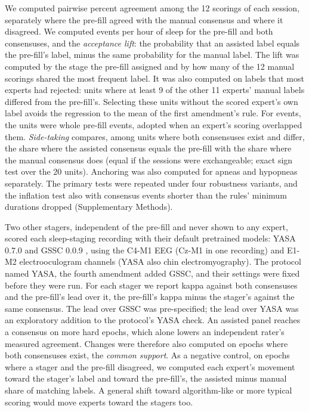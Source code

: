 \documentclass[11pt]{article}
\begin{document}
We computed pairwise percent agreement among the 12 scorings of each session, separately where the pre-fill agreed
with the manual consensus and where it disagreed. We computed events per hour of sleep for the pre-fill and both consensuses, and the \emph{acceptance lift}: the
probability that an assisted label equals the pre-fill's label, minus the same probability for the manual label. The lift was computed by the stage the pre-fill
assigned and by how many of the 12 manual scorings shared the most frequent label. It was also computed on labels
that most experts had rejected: units where at least 9 of the other 11 experts' manual labels differed from the
pre-fill's. Selecting these units without the scored expert's own label avoids the regression to the mean of the
first amendment's rule. For events, the units were whole pre-fill events, adopted when an expert's scoring overlapped
them. \emph{Side-taking} compares, among units where both consensuses exist and differ, the share where the assisted
consensus equals the pre-fill with the share where the manual consensus does (equal if the sessions were
exchangeable; exact sign test over the 20 units). Anchoring was also computed for apneas and
hypopneas separately. The primary tests were repeated under four robustness variants, and the inflation test also
with consensus events shorter than the rules' minimum durations dropped (Supplementary Methods).

Two other stagers, independent of the pre-fill and never shown to any expert, scored each sleep-staging recording with
their default pretrained models: YASA 0.7.0 \citep{vallat2021} and GSSC 0.0.9 \citep{hanna2023}, using the C4-M1 EEG
(Cz-M1 in one recording) and E1-M2 electrooculogram channels (YASA also chin electromyography). The protocol named YASA, the fourth amendment added GSSC, and their settings were fixed before they were run. For
each stager we report kappa against both consensuses and the pre-fill's lead over it, the pre-fill's kappa minus the
stager's against the same consensus. The lead over GSSC was pre-specified; the lead over YASA was an exploratory
addition to the protocol's YASA check. An assisted panel reaches a consensus on more hard epochs, which alone lowers
an independent rater's measured agreement. Changes were therefore also computed on epochs where both consensuses
exist, the \emph{common support}. As a negative control, on epochs where a stager and the pre-fill disagreed, we
computed each expert's movement toward the stager's label and toward the pre-fill's, the assisted minus manual share
of matching labels. A general shift toward algorithm-like or more typical scoring would move experts toward the
stagers too.
\end{document}
